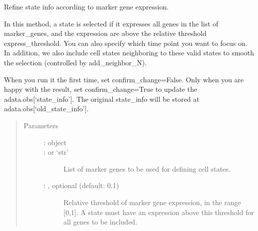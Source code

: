 \documentclass[letterpaper,10pt,english]{sphinxmanual}
\begin{document}
\begin{fulllineitems}
\label{\detokenize{cospar.pp.refine_state_info_by_marker_genes:cospar.pp.refine_state_info_by_marker_genes}}
Refine state info according to marker gene expression.

In this method, a state is selected if it expresses all genes in the list
of marker\_genes, and the expression are above the relative threshold express\_threshold.
You can also specify which time point you want to focus on. In addition, we also include
cell states neighboring to these valid states to smooth the selection
(controlled by add\_neighbor\_N).

When you run it the first time, set confirm\_change=False. Only when you are happy with
the result, set confirm\_change=True to update the adata.obs{[}‘state\_info’{]}.
The original state\_info will be stored at adata.obs{[}‘old\_state\_info’{]}.
\begin{quote}\begin{description}
\item[{Parameters}] \leavevmode\begin{description}
\item[{ :  object}] \leavevmode


\item[{ :  or ‘str’}] \leavevmode
List of marker genes to be used for defining cell states.

\item[{ : , optional (default: 0.1)}] \leavevmode
Relative threshold of marker gene expression, in the range {[}0,1{]}.
A state must have an expression above this threshold for all genes
to be included.


\end{description}
\end{description}
\end{quote}
\end{fulllineitems}
\end{document}
